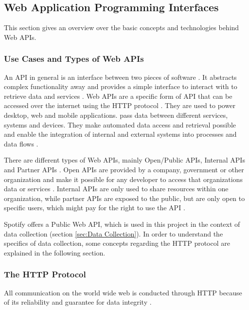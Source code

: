 \subsection{Web Application Programming Interfaces}

This section gives an overview over the basic concepts and technologies behind Web \acp{API}.

\subsubsection{Use Cases and Types of Web APIs}

An \ac{API} in general is an interface between two pieces of software \cite[S.1]{reddy2011api}.
It abstracts complex functionality away and provides a simple interface
to interact with to retrieve data and services \cite{Mozilla}.
Web APIs are a specific form of API that can be accessed over the internet
using the HTTP protocol \cite{StoplightAPITypes}.
They are used to power desktop, web and mobile applications. pass data between different
services, systems and devices. They make automated data access and retrieval possible
and enable the integration of internal and external systems into processes and data flows \cite{Lane2019WhatIs}.

There are different types of Web APIs, mainly Open/Public APIs, Internal APIs and Partner APIs \cite{StoplightAPITypes}.
Open APIs are provided by a company, government or other organization and make it possible for any developer
to access that organizations data or services \cite{StoplightAPITypes}.
Internal APIs are only used to share resources within one organization, while
partner APIs are exposed to the public, but are only open to specific users, which might pay for
the right to use the API \cite{StoplightAPITypes}.

Spotify offers a Public Web API, which is used in this project in the context of data collection (section \ref{sec:Data Collection}).
In order to understand the specifics of data collection,
some concepts regarding the \ac{HTTP} protocol are explained in the following section.

\subsubsection{The HTTP Protocol}

All communication on the world wide web is conducted through \ac{HTTP}
because of its reliability and guarantee for data integrity \cite[3f]{gourley2002http}.

